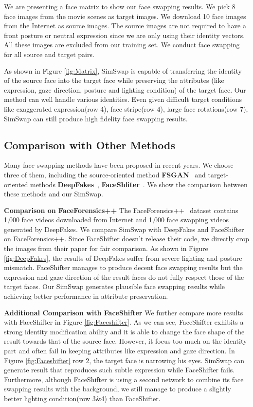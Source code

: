 \documentclass[sigconf]{acmart}
\begin{document}
We are presenting a face matrix to show our face swapping results. We pick 8 face images from the movie scenes as target images. We download 10 face images from the Internet as source images. The source images are not required to have a front posture or neutral expression since we are only using their identity vectors. All these images are excluded from our training set. We conduct face swapping for all source and target pairs.



As shown in Figure \ref{fig:Matrix}, SimSwap is capable of transferring the identity of the source face into the target face while preserving the attributes (like expression, gaze direction, posture and lighting condition) of the target face. Our method can well handle various identities. Even given difficult target conditions like exaggerated expression(row 4), face stripe(row 4), large face rotations(row 7), SimSwap can still produce high fidelity face swapping results. 

\subsection{Comparison with Other Methods}

Many face swapping methods have been proposed in recent years. We choose three of them, including the source-oriented method \textbf{FSGAN}~\cite{DBLP:FSGAN} and target-oriented methods \textbf{DeepFakes}~\cite{DeepFakes}, \textbf{FaceShfiter}~\cite{DBLP:FaceShifter}. We show the comparison between these methods and our SimSwap.

\noindent\textbf{Comparison on FaceForensics++} The FaceForensics++~\cite{DBLP:faceforensics} dataset contains 1,000 face videos downloaded from Internet and 1,000 face swapping videos generated by DeepFakes. We compare SimSwap with DeepFakes and FaceShifter on FaceForensics++. Since FaceShifter doesn't release their code, we directly crop the images from their paper for fair comparison. As shown in Figure \ref{fig:DeepFakes}, the results of DeepFakes suffer from severe lighting and posture mismatch. FaceShifter manages to produce decent face swapping results but the expression and gaze direction of the result faces do not fully respect those of the target faces. Our SimSwap generates plausible face swapping results while achieving better performance in attribute preservation.

\noindent\textbf{Additional Comparison with FaceShifter} We further compare more results with FaceShifter in Figure \ref{fig:Faceshifter}. As we can see, FaceShifter exhibits a strong identity modification ability and it is able to change the face shape of the result towards that of the source face. However, it focus too much on the identity part and often fail in keeping attributes like expression and gaze direction. In Figure \ref{fig:Faceshifter} row 2, the target face is narrowing his eyes. SimSwap can generate result that reproduces such subtle expression while FaceShifter fails. Furthermore, although FaceShifter is using a second network to combine its face swapping results with the background, we still manage to produce a slightly better lighting condition(row 3\&4) than FaceShifter.
\end{document}
